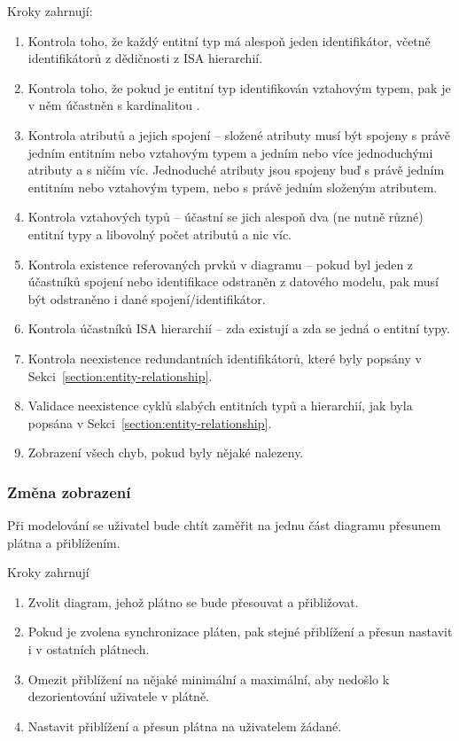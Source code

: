 \noindent Kroky zahrnují:
\begin{enumerate}
  \item Kontrola toho, že každý entitní typ má alespoň jeden identifikátor, včetně identifikátorů z dědičnosti z ISA hierarchií.
  \item Kontrola toho, že pokud je entitní typ identifikován vztahovým typem, pak je v něm účastněn s kardinalitou \oneone{}.
  \item Kontrola atributů a jejich spojení -- složené atributy musí být spojeny s právě jedním entitním nebo vztahovým typem a jedním nebo více jednoduchými atributy a s ničím víc.
        Jednoduché atributy jsou spojeny buď s právě jedním entitním nebo vztahovým typem, nebo s právě jedním složeným atributem.
  \item Kontrola vztahových typů -- účastní se jich alespoň dva (ne nutně různé) entitní typy a libovolný počet atributů a nic víc.
  \item Kontrola existence referovaných prvků v diagramu -- pokud byl jeden z účastníků spojení nebo identifikace odstraněn z datového modelu, pak musí být odstraněno i dané spojení/identifikátor.
  \item Kontrola účastníků ISA hierarchií -- zda existují a zda se jedná o entitní typy.
  \item Kontrola neexistence redundantních identifikátorů, které byly popsány v Sekci~\ref{section:entity-relationship}.
  \item Validace neexistence cyklů slabých entitních typů a hierarchií, jak byla popsána v Sekci~\ref{section:entity-relationship}.
  \item Zobrazení všech chyb, pokud byly nějaké nalezeny.
\end{enumerate}

\subsubsection*{Změna zobrazení}

Při modelování se uživatel bude chtít zaměřit na jednu část diagramu přesunem plátna a přiblížením.

\noindent Kroky zahrnují
\begin{enumerate}
  \item Zvolit diagram, jehož plátno se bude přesouvat a přibližovat.
  \item Pokud je zvolena synchronizace pláten, pak stejné přiblížení a přesun nastavit i v ostatních plátnech.
  \item Omezit přiblížení na nějaké minimální a maximální, aby nedošlo k dezorientování uživatele v plátně.
  \item Nastavit přiblížení a přesun plátna na uživatelem žádané.
\end{enumerate}

